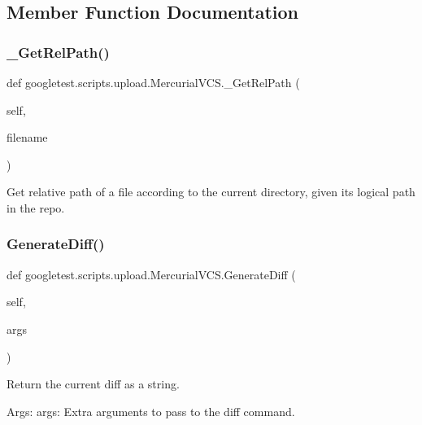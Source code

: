 \subsection{Member Function Documentation}
\mbox{\label{classgoogletest_1_1scripts_1_1upload_1_1_mercurial_v_c_s_a1d3b5d9dd222bdf4a0b72969464bab25}} 
\subsubsection{\texorpdfstring{\_GetRelPath()}{\_GetRelPath()}}
{\footnotesize\ttfamily def googletest.\+scripts.\+upload.\+Mercurial\+V\+C\+S.\+\_\+\+Get\+Rel\+Path (\begin{DoxyParamCaption}\item[{}]{self,  }\item[{}]{filename }\end{DoxyParamCaption})\hspace{0.3cm}{\ttfamily [private]}}

\begin{DoxyVerb}Get relative path of a file according to the current directory,
given its logical path in the repo.\end{DoxyVerb}
 \mbox{\label{classgoogletest_1_1scripts_1_1upload_1_1_mercurial_v_c_s_a14f6e335314bd90e0af5bfaf13614700}} 
\subsubsection{\texorpdfstring{GenerateDiff()}{GenerateDiff()}}
{\footnotesize\ttfamily def googletest.\+scripts.\+upload.\+Mercurial\+V\+C\+S.\+Generate\+Diff (\begin{DoxyParamCaption}\item[{}]{self,  }\item[{}]{args }\end{DoxyParamCaption})}

\begin{DoxyVerb}Return the current diff as a string.

Args:
  args: Extra arguments to pass to the diff command.
\end{DoxyVerb}
 

